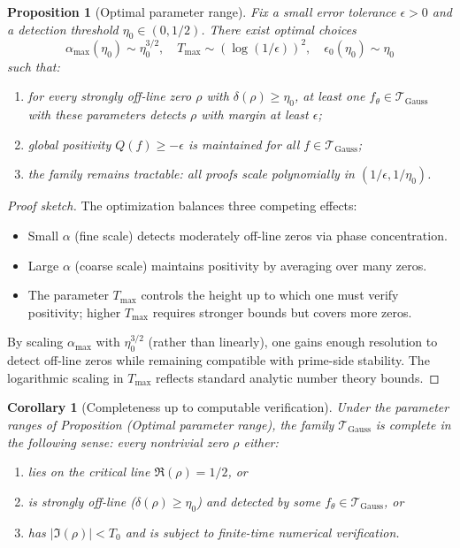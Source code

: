 \documentclass[11pt]{article}
\theoremstyle{plain}
\newtheorem{proposition}[theorem]{Proposition}
\newtheorem{corollary}[theorem]{Corollary}
\theoremstyle{definition}
\theoremstyle{remark}
\begin{document}
\begin{proposition}[Optimal parameter range]
Fix a small error tolerance $\epsilon>0$ and a detection threshold $\eta_0\in(0,1/2)$.
There exist optimal choices
\[
\alpha_{\max}(\eta_0) \sim \eta_0^{3/2}, \quad T_{\max} \sim (\log(1/\epsilon))^2, \quad \epsilon_0(\eta_0) \sim \eta_0
\]
such that:
\begin{enumerate}
  \item for every strongly off-line zero $\rho$ with $\delta(\rho)\ge \eta_0$, at least one $f_\theta\in\mathcal{T}_{\mathrm{Gauss}}$
  with these parameters detects $\rho$ with margin at least $\epsilon$;
  \item global positivity $Q(f)\ge -\epsilon$ is maintained for all $f\in\mathcal{T}_{\mathrm{Gauss}}$;
  \item the family remains tractable: all proofs scale polynomially in $(1/\epsilon, 1/\eta_0)$.
\end{enumerate}
\end{proposition}

\begin{proof}[Proof sketch]
The optimization balances three competing effects:
\begin{itemize}
  \item Small $\alpha$ (fine scale) detects moderately off-line zeros via phase concentration.
  \item Large $\alpha$ (coarse scale) maintains positivity by averaging over many zeros.
  \item The parameter $T_{\max}$ controls the height up to which one must verify positivity;
  higher $T_{\max}$ requires stronger bounds but covers more zeros.
\end{itemize}
By scaling $\alpha_{\max}$ with $\eta_0^{3/2}$ (rather than linearly), one gains enough resolution to
detect off-line zeros while remaining compatible with prime-side stability.
The logarithmic scaling in $T_{\max}$ reflects standard analytic number theory bounds.
\end{proof}

\begin{corollary}[Completeness up to computable verification]
Under the parameter ranges of Proposition (Optimal parameter range), the family $\mathcal{T}_{\mathrm{Gauss}}$ is
complete in the following sense:
every nontrivial zero $\rho$ either:
\begin{enumerate}
  \item lies on the critical line $\Re(\rho)=1/2$, or
  \item is strongly off-line ($\delta(\rho)\ge \eta_0$) and detected by some $f_\theta\in\mathcal{T}_{\mathrm{Gauss}}$, or
  \item has $|\Im(\rho)|<T_0$ and is subject to finite-time numerical verification.
\end{enumerate}
\end{corollary}
\end{document}

